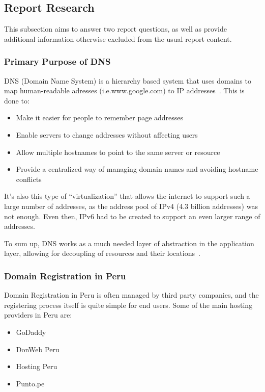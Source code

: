 \subsection{Report Research}

This subsection aims to answer two report questions, as well as provide
additional information otherwise excluded from the usual report content.

\subsubsection{Primary Purpose of DNS}

DNS (Domain Name System) is a hierarchy based system that uses domains to map
human-readable adresses (i.e.\@ www.google.com) to IP
addresses~\cite{tanenbaum:networks}. This is done to:

\begin{itemize}
    \item Make it easier for people to remember page addresses
    \item Enable servers to change addresses without affecting users
    \item Allow multiple hostnames to point to the same server or resource
    \item Provide a centralized way of managing domain names and avoiding hostname
          conflicts~\cite{tanenbaum:networks}
\end{itemize}

It's also this type of ``virtualization'' that allows the internet to support
such a large number of addresses, as the address pool of IPv4 (4.3 billion
addresses) was not enough. Even then, IPv6 had to be created to support an even
larger range of addresses.

To sum up, DNS works as a much needed layer of abstraction in the application
layer, allowing for decoupling of resources and their locations~\cite{rfc1034}.

\subsubsection{Domain Registration in Peru}

Domain Registration in Peru is often managed by third party companies, and the
registering process itself is quite simple for end users. Some of the main
hosting providers in Peru are:

\begin{itemize}
    \item GoDaddy
    \item DonWeb Peru
    \item Hosting Peru
    \item Punto.pe
\end{itemize}


